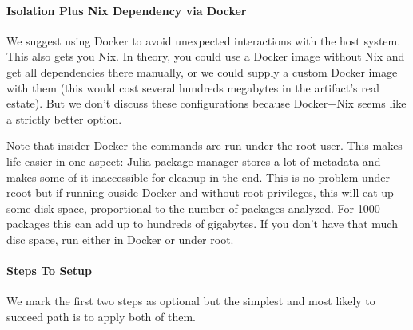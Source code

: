 \documentclass[
]{article}
\begin{document}
\hypertarget{isolation-plus-nix-dependency-via-docker}{%
\paragraph{Isolation Plus Nix Dependency via
Docker}\label{isolation-plus-nix-dependency-via-docker}}

We suggest using Docker to avoid unexpected interactions with the host
system. This also gets you Nix. In theory, you could use a Docker image
without Nix and get all dependencies there manually, or we could supply
a custom Docker image with them (this would cost several hundreds
megabytes in the artifact's real estate). But we don't discuss these
configurations because Docker+Nix seems like a strictly better option.

Note that insider Docker the commands are run under the root user. This
makes life easier in one aspect: Julia package manager stores a lot of
metadata and makes some of it inaccessible for cleanup in the end. This
is no problem under reoot but if running ouside Docker and without root
privileges, this will eat up some disk space, proportional to the number
of packages analyzed. For 1000 packages this can add up to hundreds of
gigabytes. If you don't have that much disc space, run either in Docker
or under root.

\hypertarget{steps-to-setup}{%
\paragraph{Steps To Setup}\label{steps-to-setup}}

We mark the first two steps as optional but the simplest and most likely
to succeed path is to apply both of them.
\end{document}
